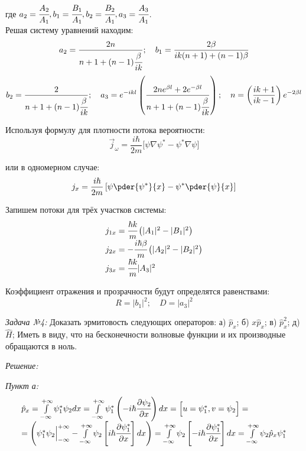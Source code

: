 где 
\( 
	a_2 = \cfrac{A_2}{A_1}, b_1 = \cfrac{B_1}{A_1}, b_2 = \cfrac{B_2}{A_1}, 
	a_3 = \cfrac{A_3}{A_1}
\). \\

Решая систему уравнений находим:
\[
	a_2 = \frac{2n}{n+1+(n-1)\cfrac{\beta}{ik}};\quad
	b_1 = \frac{2\beta}{ik(n+1)+(n-1)\beta}
\]
\[
	b_2 = \frac{2}{n+1+(n-1)\cfrac{\beta}{ik}};\quad
	a_3 = e^{-ikl}\left( \frac{2ne^{\beta l} + 2e^{-\beta l}}
		{n+1+(n-1)\cfrac{\beta}{ik}}\right);\quad
	n = \left( \frac{ik+1}{ik-1}\right)e^{-2\beta l}
\]

Используя формулу для плотности потока вероятности:
\[
	\vec{j}_\omega = \frac{i\hbar}{2m}
		\Big[ \psi\nabla\psi^{*} - \psi^{*}\nabla\psi \Big]
\]

или в одномерном случае:
\[
	j_x = \frac{i\hbar}{2m} 
		\left[ \psi\pder{\psi^{*}}{x} - \psi^{*}\pder{\psi}{x} \right]
\]

Запишем потоки для трёх участков системы:
\[
	\begin{array}{ll}
		j_{1x} = \cfrac{\hbar k}{m}\left( \vert A_1 \vert^2 - 
			\vert B_1 \vert^2 \right) \\
		j_{2x} = -\cfrac{i\hbar\beta}{m} \left( \vert A_2 \vert^2 -
			\vert B_2 \vert^2 \right) \\
		j_{3x} = \cfrac{\hbar k}{m}\vert A_3 \vert^2 
	\end{array}
\]

Коэффициент отражения и прозрачности будут определятся равенствами:
\[
	R = \vert b_1 \vert ^2;\quad
	D = \vert a_3 \vert ^2
\]

\pagebreak

\emph{Задача №4:} Доказать эрмитовость следующих операторов: 
а) \( \hat{p}_x \);
б) \( x\hat{p}_x \);
в) \( \hat{p}^2_x \);
д) \( \hat{H} \);
Иметь в виду, что на бесконечности волновые функции и их производные обращаются 
в ноль.

\emph{Решение:}

\emph{Пункт а:}
\[
\begin{array}{ll}
	\hat{p}_x = \int\limits_{-\infty}^{+\infty} \psi_{1}^{*} \psi_2 dx =
		\int\limits_{-\infty}^{+\infty} \psi_{1}^{*} 
		\left( -i\hbar\cfrac{\partial\psi_2}{\partial x} \right) dx = 
		\Big[ u = \psi_{1}^{*}, v = \psi_{2} \Big] = \\ =
		\left( \psi_{1}^{*}\psi_{2} \Big\vert_{-\infty}^{+\infty} -
		\int\limits_{-\infty}^{+\infty} \psi_{2} 
		\left[ i\hbar \cfrac{\partial\psi_{1}^{*}}{\partial x} \right] dx \right) =
		\int\limits_{-\infty}^{+\infty} \psi_{2} 
		\left[ -i\hbar \cfrac{\partial\psi_{1}^{*}}{\partial x} \right] dx =
		\int\limits_{-\infty}^{+\infty} \psi_{2} \hat{p}_x \psi_{1}^{*}
\end{array}
\]

